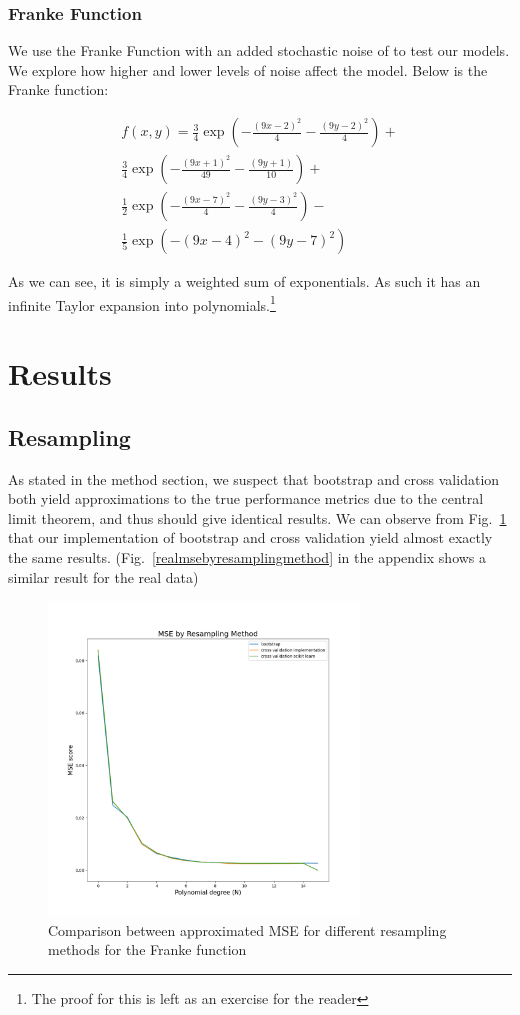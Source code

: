 \documentclass[twocolumn,10pt,cleanfoot]{asme2ej}
\begin{document}
\subsubsection{Franke Function}

We use the Franke Function with an added stochastic noise of to test our models. We explore how higher and lower levels of noise affect the model. Below is the Franke function:

\begin{multline}
f(x,y) = \frac{3}{4}\exp{\left(-\frac{(9x-2)^2}{4}-\frac{(9y-2)^2}{4}\right)} + \\ \frac{3}{4}\exp{\left(-\frac{(9x+1)^2}{49}-\frac{(9y+1)}{10}\right)} + \\
\frac{1}{2}\exp{\left(-\frac{(9x-7)^2}{4}-\frac{(9y-3)^2}{4}\right)} - \\
\frac{1}{5}\exp{\left(-(9x-4)^2-(9y-7)^2\right)}
\end{multline}

As we can see, it is simply a weighted sum of exponentials. As such it has an infinite Taylor expansion into polynomials.\footnote{The proof for this is left as an exercise for the reader}


\section{Results}

\subsection{Resampling}

As stated in the method section, we suspect that bootstrap and cross validation both yield approximations to the true performance metrics due to the central limit theorem, and thus should give identical results. We can observe from Fig.~\ref{frankemsebyresamplingmethod} that our implementation of bootstrap and cross validation yield almost exactly the same results. (Fig.~\ref{realmsebyresamplingmethod} in the appendix shows a similar result for the real data)

\begin{figure}[h]
\centerline{\includegraphics[width=3.25in]{figure/frankemsebyresamplingmethod.png}}
\caption{Comparison between approximated MSE for different resampling methods for the Franke function}
\label{frankemsebyresamplingmethod}
\end{figure}
\end{document}
